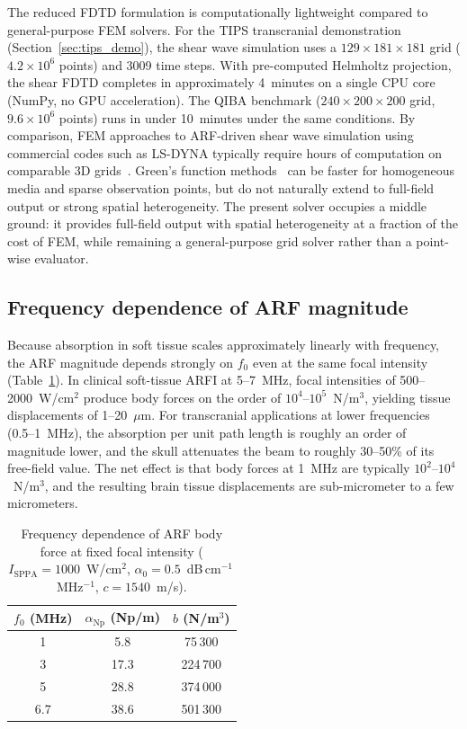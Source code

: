 \documentclass{iopjournal}
\begin{document}
The reduced FDTD formulation is computationally lightweight compared to
general-purpose FEM solvers. For the TIPS transcranial demonstration
(Section~\ref{sec:tips_demo}), the shear wave simulation uses a
$129 \times 181 \times 181$ grid ($4.2 \times 10^6$ points) and 3009 time
steps. With pre-computed Helmholtz projection, the shear FDTD completes in
approximately 4~minutes on a single CPU core (NumPy, no GPU acceleration).
The QIBA benchmark ($240 \times 200 \times 200$ grid, $9.6 \times 10^6$
points) runs in under 10~minutes under the same conditions. By comparison,
FEM approaches to ARF-driven shear wave simulation using commercial codes
such as LS-DYNA typically require hours of computation on comparable 3D
grids~\cite{palmeri2005fem,palmeri2017fem}. Green's function
methods~\cite{yang2018gpu} can be faster for homogeneous media and sparse
observation points, but do not naturally extend to full-field output or strong
spatial heterogeneity. The present solver occupies a middle ground: it provides
full-field output with spatial heterogeneity at a fraction of the cost of FEM,
while remaining a general-purpose grid solver rather than a point-wise
evaluator.

\subsection{Frequency dependence of ARF magnitude}

Because absorption in soft tissue scales approximately linearly with frequency,
the ARF magnitude depends strongly on $f_0$ even at the same focal intensity
(Table~\ref{tab:arf_scaling}). In clinical soft-tissue ARFI at 5--7~MHz, focal intensities of
500--2000~W/cm$^2$ produce body forces on the order of
$10^4$--$10^5$~N/m$^3$, yielding tissue displacements of 1--20~$\mu$m.
For transcranial applications at lower frequencies (0.5--1~MHz), the absorption
per unit path length is roughly an order of magnitude lower, and the skull
attenuates the beam to roughly 30--50\% of its free-field value. The net effect
is that body forces at 1~MHz are typically $10^2$--$10^4$~N/m$^3$, and the
resulting brain tissue displacements are sub-micrometer to a few micrometers.


\begin{table}
\centering
\caption{Frequency dependence of ARF body force at fixed focal intensity
  ($I_{\mathrm{SPPA}} = 1000$~W/cm$^2$,
   $\alpha_0 = 0.5$~dB\,cm$^{-1}$\,MHz$^{-1}$, $c = 1540$~m/s).}
\label{tab:arf_scaling}
\begin{tabular}{ccc}
\hline
$f_0$ (MHz) & $\alpha_{\mathrm{Np}}$ (Np/m) & $b$ (N/m$^3$) \\
\hline
1   &  5.8  & 75\,300  \\
3   & 17.3  & 224\,700 \\
5   & 28.8  & 374\,000 \\
6.7 & 38.6  & 501\,300 \\
\hline
\end{tabular}
\end{table}
\end{document}
